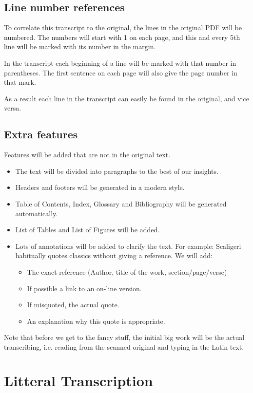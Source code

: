 \documentclass{report}
\begin{document}
\subsection{Line number references}
To correlate this transcript to the original, the lines
in the original PDF will be numbered.
The numbers will start with 1 on each page, and this and every 5th line
will be marked with its number in the margin.

In the transcript each beginning of a line will be marked with that number
in parentheses. The first sentence on each page will also give the page
number in that mark.

As a result each line in the transcript can easily be found in the original,
and vice versa.

\subsection{Extra features}
Features will be added that are not in the original text.
\begin{itemize}
\item The text will be divided into paragraphs to the best of our insights.
\item Headers and footers will be generated in a modern style.
\item Table of Contents, Index, Glossary and Bibliography will be generated
automatically.
\item List of Tables and List of Figures will be added.
\item Lots of annotations will be added to clarify the text.
For example: Scaligeri habitually quotes classics without giving a reference.
We will add:
    \begin{itemize}
    \item The exact reference (Author, title of the work, section/page/verse)
    \item If possible a link to an on-line version.
    \item If misquoted, the actual quote.
    \item An explanation why this quote is appropriate.
    \end{itemize}
\end{itemize}

Note that before we get to the fancy stuff, the initial big work will be
 the actual transcribing,
i.e. reading from the scanned original and typing in the Latin text.

\section{Litteral Transcription}
\end{document}
